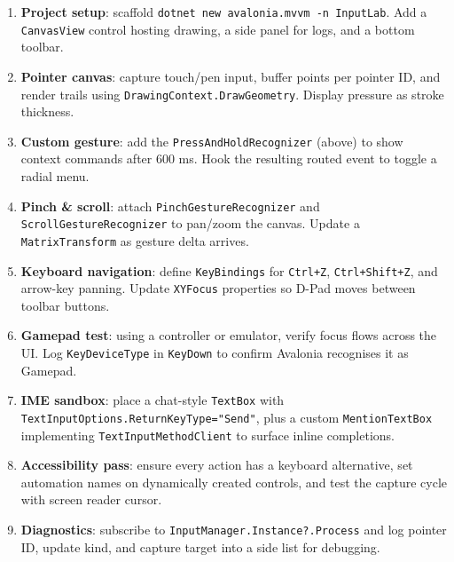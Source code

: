 \begin{enumerate}
\def\labelenumi{\arabic{enumi}.}
\tightlist
\item
  \textbf{Project setup}: scaffold
  \passthrough{\lstinline!dotnet new avalonia.mvvm -n InputLab!}. Add a
  \passthrough{\lstinline!CanvasView!} control hosting drawing, a side
  panel for logs, and a bottom toolbar.
\item
  \textbf{Pointer canvas}: capture touch/pen input, buffer points per
  pointer ID, and render trails using
  \passthrough{\lstinline!DrawingContext.DrawGeometry!}. Display
  pressure as stroke thickness.
\item
  \textbf{Custom gesture}: add the
  \passthrough{\lstinline!PressAndHoldRecognizer!} (above) to show
  context commands after 600 ms. Hook the resulting routed event to
  toggle a radial menu.
\item
  \textbf{Pinch \& scroll}: attach
  \passthrough{\lstinline!PinchGestureRecognizer!} and
  \passthrough{\lstinline!ScrollGestureRecognizer!} to pan/zoom the
  canvas. Update a \passthrough{\lstinline!MatrixTransform!} as gesture
  delta arrives.
\item
  \textbf{Keyboard navigation}: define
  \passthrough{\lstinline!KeyBindings!} for
  \passthrough{\lstinline!Ctrl+Z!},
  \passthrough{\lstinline!Ctrl+Shift+Z!}, and arrow-key panning. Update
  \passthrough{\lstinline!XYFocus!} properties so D-Pad moves between
  toolbar buttons.
\item
  \textbf{Gamepad test}: using a controller or emulator, verify focus
  flows across the UI. Log \passthrough{\lstinline!KeyDeviceType!} in
  \passthrough{\lstinline!KeyDown!} to confirm Avalonia recognises it as
  Gamepad.
\item
  \textbf{IME sandbox}: place a chat-style
  \passthrough{\lstinline!TextBox!} with
  \passthrough{\lstinline!TextInputOptions.ReturnKeyType="Send"!}, plus
  a custom \passthrough{\lstinline!MentionTextBox!} implementing
  \passthrough{\lstinline!TextInputMethodClient!} to surface inline
  completions.
\item
  \textbf{Accessibility pass}: ensure every action has a keyboard
  alternative, set automation names on dynamically created controls, and
  test the capture cycle with screen reader cursor.
\item
  \textbf{Diagnostics}: subscribe to
  \passthrough{\lstinline!InputManager.Instance?.Process!} and log
  pointer ID, update kind, and capture target into a side list for
  debugging.
\end{enumerate}


